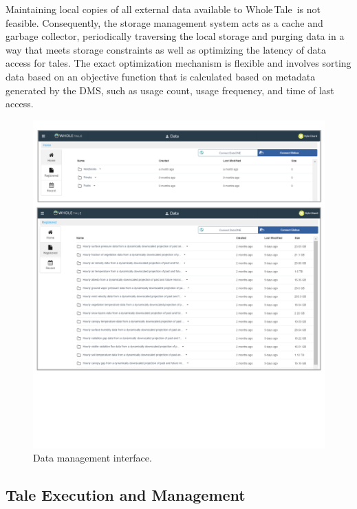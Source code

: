 \documentclass[review]{elsarticle}
\newcommand{\wt}{Whole\,Tale}
\begin{document}
Maintaining local copies of all external data available to \wt\ is not feasible. Consequently, the storage management system acts as a cache and garbage collector, periodically traversing the local storage and purging data in a way that meets storage constraints as well as optimizing the latency of data access for tales. The exact optimization mechanism is flexible and involves sorting data based on an objective function that is calculated based on metadata generated by the DMS, such as usage count, usage frequency, and time of last access.

\begin{figure}[ht!]
\centering
  \includegraphics[trim=0in 3in 0in 0in,clip,width=0.75\columnwidth]{data-management.pdf}
\caption{Data management interface. \label{fig:datamanagment}}
\end{figure}

\subsection{Tale Execution and Management}
\end{document}
